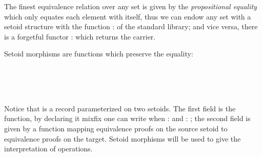 The finest equivalence relation over any set is given
by the \emph{propositional equality} which only equates each element with
itself, thus we can endow any set with a setoid structure with the function
 :    of the standard library; and vice versa, there
is a forgetful functor \AgdaUnderscore{} :   
which returns the carrier.

Setoid morphisms are functions which preserve the equality:

\begin{code}
\>[0]\AgdaSpace{}%
\AgdaSpace{}%
\AgdaSymbol{(}\AgdaSpace{}%
\AgdaSpace{}%
\AgdaSymbol{:}\AgdaSpace{}%
\AgdaSymbol{)}\AgdaSpace{}%
\AgdaSymbol{:}\AgdaSpace{}%
\AgdaSpace{}%
\<%
\\
\>[0][@{}l@{\AgdaIndent{0}}]%
\>[2]\<%
\\
\>[2][@{}l@{\AgdaIndent{0}}]%
\>[4]\AgdaSpace{}%
\AgdaSymbol{:}\AgdaSpace{}%
\AgdaSpace{}%
\AgdaSpace{}%
\AgdaSpace{}%
\AgdaSpace{}%
\AgdaSpace{}%
\AgdaSpace{}%
\<%
\\
%
\>[4]\AgdaSpace{}%
\AgdaSymbol{:}\AgdaSpace{}%
\AgdaSpace{}%
\AgdaSymbol{\{}\AgdaSpace{}%
\AgdaSymbol{\}}\AgdaSpace{}%
\AgdaSpace{}%
\AgdaSpace{}%
\AgdaSpace{}%
\AgdaSpace{}%
\AgdaSpace{}%
\AgdaSpace{}%
\AgdaSpace{}%
\AgdaSpace{}%
\AgdaSymbol{(}\AgdaSpace{}%
\AgdaSymbol{)}\AgdaSpace{}%
\AgdaSymbol{(}\AgdaSpace{}%
\AgdaSymbol{)}\<%
\end{code}


\noindent Notice that \AgdaSpace{} is a record parameterized on two setoids.
The first field is the function, by declaring it mixfix one can
write    when  :   
and  :   ; the second field is
given by a function mapping equivalence proofs on the source setoid to
equivalence proofs on the target. Setoid morphisms will be used to
give the interpretation of operations.

